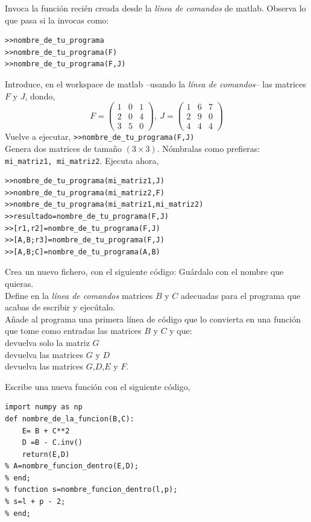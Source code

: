 \begin{enumerate}
Invoca la función recién creada desde la \emph{línea de comandos} de matlab. Observa lo que pasa si la invocas como:
\begin{verbatim}
>>nombre_de_tu_programa
>>nombre_de_tu_programa(F)
>>nombre_de_tu_programa(F,J)
\end{verbatim}
Introduce, en el  workspace de matlab --usando la \emph{línea de comandos}--  las matrices $F$ y $J$, dondo,
\begin{equation*}
F =\begin{pmatrix}
1&0&1\\
2&0&4\\
3&5&0
\end{pmatrix}, \ J=\begin{pmatrix}
1&6&7\\
2&9&0\\
4&4&4
\end{pmatrix}
\end{equation*}
Vuelve a ejecutar, \verb|>>nombre_de_tu_programa(F,J)| \\
Genera dos matrices de tamaño $(3\times 3)$. Nómbralas como prefieras: \verb|mi_matriz1, mi_matriz2|. Ejecuta ahora,
\begin{verbatim}
>>nombre_de_tu_programa(mi_matriz1,J)
>>nombre_de_tu_programa(mi_matriz2,F)
>>nombre_de_tu_programa(mi_matriz1,mi_matriz2)
>>resultado=nombre_de_tu_programa(F,J)
>>[r1,r2]=nombre_de_tu_programa(F,J)
>>[A,B;r3]=nombre_de_tu_programa(F,J)
>>[A,B;C]=nombre_de_tu_programa(A,B)
\end{verbatim}
Crea un nuevo fichero, con el siguiente código:
Guárdalo con el nombre que quieras.\\
Define en la \emph{línea de comandos} matrices $B$ y $C$ adecuadas para el programa que acabas de escribir y ejecútalo.\\
Añade al programa una primera línea de código que lo convierta en una función que tome como entradas las matrices $B$ y $C$  y que:\\
devuelva solo la matriz $G$\\
devuelva las matrices $G$ y $D$\\ 
devuelva las matrices $G$,$D$,$E$ y $F$.

Escribe una nueva función con el siguiente código,
\begin{verbatim}
import numpy as np
def nombre_de_la_funcion(B,C):
    E= B + C**2
    D =B - C.inv()
    return(E,D)
% A=nombre_funcion_dentro(E,D);
% end;
% function s=nombre_funcion_dentro(l,p);
% s=l + p - 2;
% end;
\end{verbatim}


\end{enumerate}
